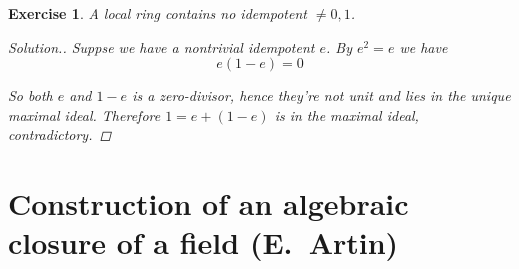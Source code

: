 \documentclass{article}
\theoremstyle{breakstyle}
\newtheorem{exercise}{Exercise}
\newenvironment{solution}
  {\begin{proof}[Solution.]\renewcommand{\qedsymbol}{}}
  {\end{proof}}
\begin{document}
\begin{exercise}
A local ring contains no idempotent \(\neq0,1\).

\begin{solution}
    Suppse we have a nontrivial idempotent $e$.
        By $e^2=e$ we have
        $$
        e(1-e)=0
        $$

        So both $e$ and $1-e$ is a zero-divisor, hence they're not unit and lies in the unique maximal ideal.
        Therefore $1=e+(1-e)$ is in the maximal ideal, contradictory.

\end{solution}
\end{exercise}

\section*{Construction of an algebraic closure of a field (E.~Artin)}
\end{document}
